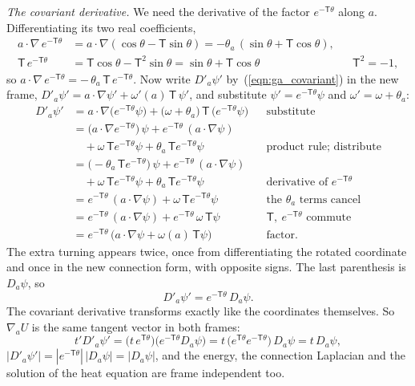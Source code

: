 \emph{The covariant derivative.} We need the derivative of the factor $e^{-\mathsf T\theta}$ along $a$. Differentiating its two real coefficients,
\begin{align*}
a\cdot\nabla\, e^{-\mathsf T\theta} &= a\cdot\nabla(\cos\theta - \mathsf T\sin\theta) = -\theta_a\,(\sin\theta + \mathsf T\cos\theta) , \\
\mathsf T\, e^{-\mathsf T\theta} &= \mathsf T\cos\theta - \mathsf T^2\sin\theta = \sin\theta + \mathsf T\cos\theta && \mathsf T^2 = -1 ,
\end{align*}
so $a\cdot\nabla\, e^{-\mathsf T\theta} = -\,\theta_a\,\mathsf T\, e^{-\mathsf T\theta}$. Now write $D'_a\psi'$ by~(\ref{eqn:ga_covariant}) in the new frame, $D'_a\psi' = a\cdot\nabla\psi' + \omega'(a)\,\mathsf T\,\psi'$, and substitute $\psi' = e^{-\mathsf T\theta}\psi$ and $\omega' = \omega + \theta_a$:
\begin{align*}
D'_a \psi' &= a\cdot\nabla\big(e^{-\mathsf T\theta}\psi\big) + \big(\omega + \theta_a\big)\, \mathsf T\, \big(e^{-\mathsf T\theta}\psi\big) && \text{substitute} \\
&= \big(a\cdot\nabla e^{-\mathsf T\theta}\big)\,\psi + e^{-\mathsf T\theta}\, (a\cdot\nabla\psi) \\
&\quad + \omega\,\mathsf T e^{-\mathsf T\theta}\psi + \theta_a\,\mathsf T e^{-\mathsf T\theta}\psi && \text{product rule; distribute} \\
&= \big(-\theta_a\,\mathsf T e^{-\mathsf T\theta}\big)\,\psi + e^{-\mathsf T\theta}\, (a\cdot\nabla\psi) \\
&\quad + \omega\,\mathsf T e^{-\mathsf T\theta}\psi + \theta_a\,\mathsf T e^{-\mathsf T\theta}\psi && \text{derivative of } e^{-\mathsf T\theta} \\
&= e^{-\mathsf T\theta}\, (a\cdot\nabla\psi) + \omega\,\mathsf T e^{-\mathsf T\theta}\psi && \text{the } \theta_a \text{ terms cancel} \\
&= e^{-\mathsf T\theta}\, (a\cdot\nabla\psi) + e^{-\mathsf T\theta}\,\omega\,\mathsf T \psi && \mathsf T,\ e^{-\mathsf T\theta} \text{ commute} \\
&= e^{-\mathsf T\theta}\,\big(a\cdot\nabla\psi + \omega(a)\,\mathsf T\psi\big) && \text{factor.}
\end{align*}
The extra turning appears twice, once from differentiating the rotated coordinate and once in the new connection form, with opposite signs. The last parenthesis is $D_a\psi$, so
\begin{equation}
\label{eqn:ga_gauge}
D'_a \psi' = e^{-\mathsf T \theta}\, D_a \psi .
\end{equation}
The covariant derivative transforms exactly like the coordinates themselves. So $\nabla_a U$ is the same tangent vector in both frames:
\begin{equation*}
t' D'_a\psi' = \big(t\,e^{\mathsf T\theta}\big)\big(e^{-\mathsf T\theta}D_a\psi\big) = t\,\big(e^{\mathsf T\theta}e^{-\mathsf T\theta}\big)\,D_a\psi = t\,D_a\psi ,
\end{equation*}
$|D'_a\psi'| = |e^{-\mathsf T\theta}|\,|D_a\psi| = |D_a\psi|$, and the energy, the connection Laplacian and the solution of the heat equation are frame independent too.


